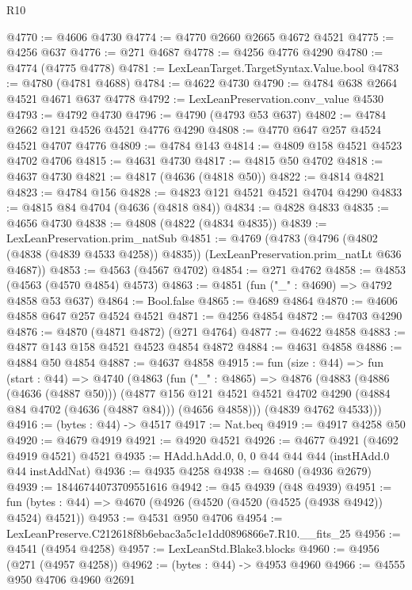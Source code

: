 \begin{lexlean}{R10}
\begin{coremodule}
@4770 := @4606 @4730
@4774 := @4770 @2660 @2665 @4672 @4521
@4775 := @4256 @637
@4776 := @271 @4687
@4778 := @4256 @4776 @4290
@4780 := @4774 (@4775 @4778)
@4781 := LexLeanTarget.TargetSyntax.Value.bool
@4783 := @4780 (@4781 @4688)
@4784 := @4622 @4730
@4790 := @4784 @638 @2664 @4521 @4671 @637 @4778
@4792 := LexLeanPreservation.conv_value @4530
@4793 := @4792 @4730
@4796 := @4790 (@4793 @53 @637)
@4802 := @4784 @2662 @121 @4526 @4521 @4776 @4290
@4808 := @4770 @647 @257 @4524 @4521 @4707 @4776
@4809 := @4784 @143
@4814 := @4809 @158 @4521 @4523 @4702 @4706
@4815 := @4631 @4730
@4817 := @4815 @50 @4702
@4818 := @4637 @4730
@4821 := @4817 (@4636 (@4818 @50))
@4822 := @4814 @4821
@4823 := @4784 @156
@4828 := @4823 @121 @4521 @4521 @4704 @4290
@4833 := @4815 @84 @4704 (@4636 (@4818 @84))
@4834 := @4828 @4833
@4835 := @4656 @4730
@4838 := @4808 (@4822 (@4834 @4835))
@4839 := LexLeanPreservation.prim_natSub
@4851 := @4769
    (@4783
      (@4796 (@4802 (@4838 (@4839 @4533 @4258)) @4835))
      (LexLeanPreservation.prim_natLt @636 @4687))
@4853 := @4563 (@4567 @4702)
@4854 := @271 @4762
@4858 := @4853 (@4563 (@4570 @4854) @4573)
@4863 := @4851 (fun ("_" : @4690) => @4792 @4858 @53 @637)
@4864 := Bool.false
@4865 := @4689 @4864
@4870 := @4606 @4858 @647 @257 @4524 @4521
@4871 := @4256 @4854
@4872 := @4703 @4290
@4876 := @4870 (@4871 @4872) (@271 @4764)
@4877 := @4622 @4858
@4883 := @4877 @143 @158 @4521 @4523 @4854 @4872
@4884 := @4631 @4858
@4886 := @4884 @50 @4854
@4887 := @4637 @4858
@4915 := fun (size : @44) =>
  fun (start : @44) =>
  @4740
    (@4863
      (fun ("_" : @4865) =>
      @4876
        (@4883
          (@4886 (@4636 (@4887 @50)))
          (@4877
            @156
            @121
            @4521
            @4521
            @4702
            @4290
            (@4884 @84 @4702 (@4636 (@4887 @84)))
            (@4656 @4858)))
        (@4839 @4762 @4533)))
@4916 := (bytes : @44) -> @4517
@4917 := Nat.beq
@4919 := @4917 @4258 @50
@4920 := @4679 @4919
@4921 := @4920 @4521
@4926 := @4677 @4921 (@4692 @4919 @4521) @4521
@4935 := HAdd.hAdd.{0, 0, 0} @44 @44 @44 (instHAdd.{0} @44 instAddNat)
@4936 := @4935 @4258
@4938 := @4680 (@4936 @2679)
@4939 := 18446744073709551616
@4942 := @45 @4939 (@48 @4939)
@4951 := fun (bytes : @44) => @4670 (@4926 (@4520 (@4520 (@4525 (@4938 @4942)) @4524) @4521))
@4953 := @4531 @950 @4706
@4954 := LexLeanPreserve.C212618f8b6ebac3a5c1e1dd0896866e7.R10.__fits_25
@4956 := @4541 (@4954 @4258)
@4957 := LexLeanStd.Blake3.blocks
@4960 := @4956 (@271 (@4957 @4258))
@4962 := (bytes : @44) -> @4953 @4960
@4966 := @4555 @950 @4706 @4960 @2691

\end{coremodule}
\end{lexlean}
